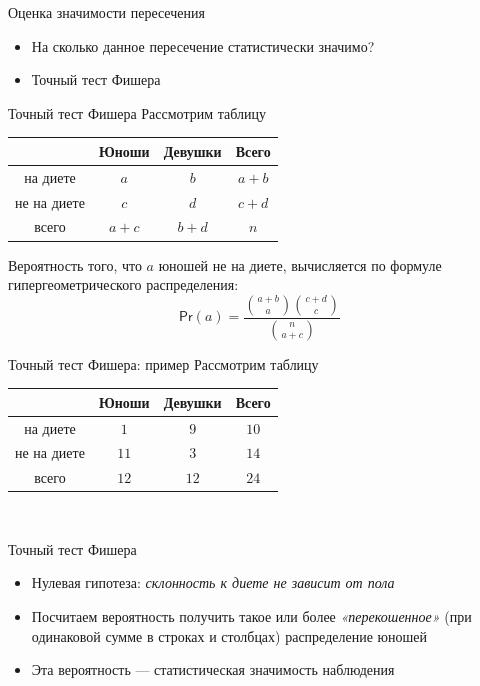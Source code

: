 \documentclass[10pt,pdf,utf8,russian,aspectratio=169]{beamer}
\begin{document}
\begin{frame}{Оценка значимости пересечения}
  \begin{itemize}[<+->]
    \item На сколько данное пересечение статистически значимо?
    \item Точный тест Фишера
  \end{itemize}
\end{frame}

\begin{frame}{Точный тест Фишера}
    Рассмотрим таблицу
    \begin{table}[!ht]
        \centering
        \begin{tabular}{c|c|c|c}
                 & Юноши   & Девушки &  Всего \\ \hline
        на диете & $a$     & $b$     & $a + b$ \\ \hline
     не на диете & $c$     & $d$     & $c + d$ \\ \hline
           всего & $a + c$ & $b + d$ & $n$ \\
        \end{tabular}
    \end{table}
    Вероятность того, что $a$ юношей не на диете, вычисляется по формуле гипергеометрического распределения:
        $$\mathsf{Pr}(a) = \frac{\binom{a + b}{a}\binom{c + d}{c}}{\binom{n}{a + c}}$$
\end{frame}

\begin{frame}{Точный тест Фишера: пример}
    Рассмотрим таблицу
    \begin{table}[!ht]
        \centering
        \begin{tabular}{c|c|c|c}
                 & Юноши   & Девушки &  Всего \\ \hline
        на диете & $1$     & $9$     & $10$ \\ \hline
     не на диете & $11$     & $3$     & $14$ \\ \hline
           всего & $12$ & $12$ & $24$ \\
        \end{tabular}
    \end{table}
     \\
\end{frame}

\begin{frame}{Точный тест Фишера}
  \begin{itemize}[<+->]
    \item Нулевая гипотеза: \emph{склонность к диете не зависит от пола}
    \item Посчитаем вероятность получить такое или более \emph{«перекошенное»} (при одинаковой сумме в строках и столбцах) распределение юношей
    \item Эта вероятность --- статистическая значимость наблюдения
  \end{itemize}
\end{frame}
\end{document}

